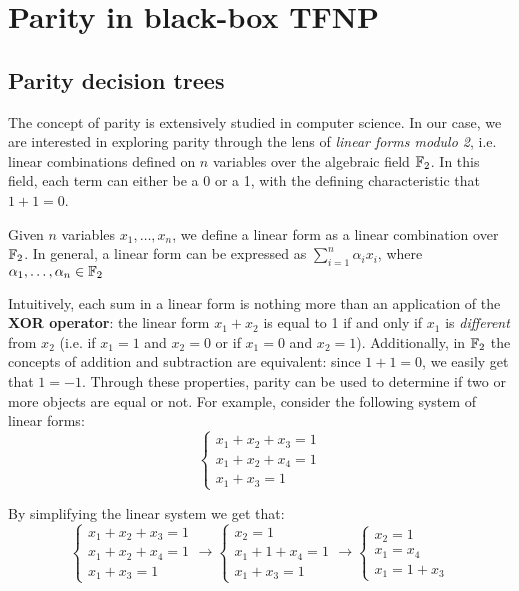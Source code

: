
\chapter{Parity in black-box \textsf{TFNP}} \label{chap:parity-tfnp}

\section{Parity decision trees}

The concept of parity is extensively studied in computer science. In our case, we are interested in exploring parity through the lens of \textit{linear forms modulo 2}, i.e. linear combinations defined on $n$ variables over the algebraic field $\mathbb{F}_2$. In this field, each term can either be a 0 or a 1, with the defining characteristic that $1+1 = 0$.

\begin{definition}
 Given $n$ variables $x_1, \ldots, x_n$, we define a linear form as a linear combination over $\mathbb{F}_2$. In general, a linear form can be expressed as $\sum\limits_{i = 1}^n \alpha_i x_i$, where $\alpha_1, \ldots, \alpha_n \in \mathbb{F}_2$
\end{definition}

Intuitively, each sum in a linear form is nothing more than an application of the \textbf{XOR operator}: the linear form $x_1 + x_2$ is equal to 1 if and only if $x_1$ is \textit{different} from $x_2$ (i.e. if $x_1 = 1$ and $x_2 = 0$ or if $x_1 = 0$ and $x_2 = 1$). Additionally, in $\mathbb{F}_2$ the concepts of addition and subtraction are equivalent: since $1+1 = 0$, we easily get that $1 = -1$. Through these properties, parity can be used to determine if two or more objects are equal or not. For example, consider the following system of linear forms:
\[\left \{ \begin{array}{l}
 x_1 + x_2 + x_3 = 1 \\
 x_1 + x_2 + x_4 = 1 \\
 x_1 + x_3 = 1
\end{array} \right .\]

\noindent
By simplifying the linear system we get that:
\[\left \{ \begin{array}{l}
 x_1 + x_2 + x_3 = 1 \\
 x_1 + x_2 + x_4 = 1 \\
 x_1 + x_3 = 1
\end{array} \right . \longrightarrow
\left \{ \begin{array}{l}
 x_2 = 1\\
 x_1 + 1 + x_4 = 1 \\
 x_1 + x_3 = 1
\end{array} \right . \longrightarrow
\left \{ \begin{array}{l}
 x_2 = 1\\
 x_1 = x_4 \\
 x_1 = 1+x_3
\end{array} \right .\]

